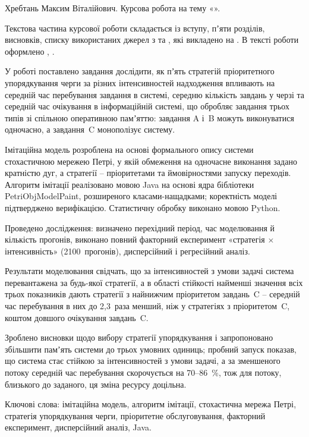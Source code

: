 
Хребтань Максим Віталійович. Курсова робота на тему «\kpiTitle».

Текстова частина курсової роботи складається із вступу, пʼяти розділів, висновків, списку
використаних джерел з  та
, які викладено на
. В тексті роботи оформлено
, .

У роботі поставлено завдання дослідити, як пʼять стратегій пріоритетного упорядкування черги за
різних інтенсивностей надходження впливають на середній час перебування завдання в системі,
середню кількість завдань у черзі та середній час очікування в інформаційній системі, що обробляє
завдання трьох типів зі спільною оперативною памʼяттю: завдання A і~B можуть виконуватися
одночасно, а завдання~C монополізує систему.

Імітаційна модель розроблена на основі формального опису системи стохастичною мережею Петрі, у
якій обмеження на одночасне виконання задано кратністю дуг, а стратегії -- пріоритетами та
ймовірностями запуску переходів. Алгоритм імітації реалізовано мовою Java на основі ядра
бібліотеки PetriObjModelPaint, розширеного класами-нащадками; коректність моделі підтверджено
верифікацією. Статистичну обробку виконано мовою Python.

Проведено дослідження: визначено перехідний період, час моделювання й кількість прогонів,
виконано повний факторний експеримент «стратегія $\times$ інтенсивність» (2100~прогонів),
дисперсійний і регресійний аналіз.

Результати моделювання свідчать, що за інтенсивностей з умови задачі система перевантажена за
будь-якої стратегії, а в області стійкості найменші значення всіх трьох показників дають
стратегії з найнижчим пріоритетом завдань~C -- середній час перебування в них до 2,3~раза менший,
ніж у стратегіях з пріоритетом~C, коштом довшого очікування завдань~C.

Зроблено висновки щодо вибору стратегії упорядкування і запропоновано збільшити памʼять системи
до трьох умовних одиниць; пробний запуск показав, що система стає стійкою за інтенсивностей з
умови задачі, а за зменшеного потоку середній час перебування скорочується на 70--86~\%, тож для
потоку, близького до заданого, ця зміна ресурсу доцільна.

\noindent Ключові слова: імітаційна модель, алгоритм імітації, стохастична мережа Петрі,
стратегія упорядкування черги, пріоритетне обслуговування, факторний експеримент, дисперсійний
аналіз, Java.
